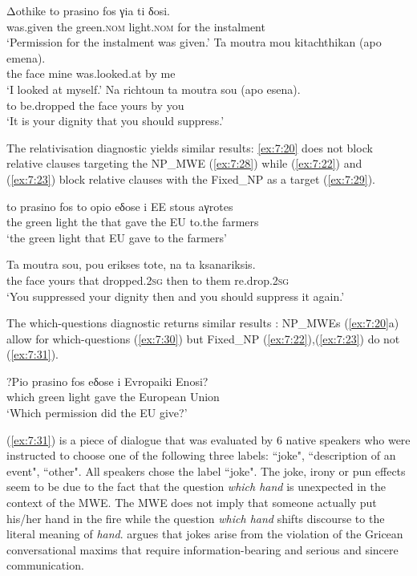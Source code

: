\documentclass[output=paper]{langsci/langscibook}
\begin{document}
\ea%
    \label{ex:7:27}
\ea  \label{ex:7:27a}
\gll        Δothike to prasino fos γia ti δosi. \\
            was.given the green.\textsc{nom} light.\textsc{nom} for the instalment \\
\glt       `Permission for the instalment was given.'
\ex  \label{ex:7:27b}
\gll *Ta moutra mou kitachthikan (apo emena).\\
         the face mine was.looked.at by me\\
\glt        `I looked at myself.'
\ex  \label{ex:7:27c}
\gll *Na richtoun ta moutra sou (apo esena).\\
        to be.dropped the face yours by you\\
\glt `It is your dignity that you should suppress.'
\z
\z

The relativisation diagnostic yields similar results: \ref{ex:7:20} does not block relative clauses targeting the NP\_MWE (\ref{ex:7:28}) while (\ref{ex:7:22}) and (\ref{ex:7:23}) block relative clauses with the Fixed\_NP as a target (\ref{ex:7:29}).

\ea%
    \label{ex:7:28}
\gll   to prasino fos to opio eδose i EE stous aγrotes \\
             the green light the that gave the EU to.the farmers\\
\glt  `the green light that EU gave to the farmers'
\z

 

\ea%
\label{ex:7:29}
\gll *Ta moutra sou, pou erikses tote, na ta ksanariksis.\\
      the face yours that dropped.\textsc{2sg} then to them re.drop.\textsc{2sg} \\
\glt `You suppressed your dignity then and you should suppress it again.'
\z

The which-questions diagnostic returns similar results : NP\_MWEs  (\ref{ex:7:20}a) allow for which-questions (\ref{ex:7:30}) but  Fixed\_NP  (\ref{ex:7:22}),(\ref{ex:7:23}) do not (\ref{ex:7:31}).

\ea%
\label{ex:7:30}
\gll ?Pio prasino fos eδose i Evropaiki Enosi?\\
             which green light gave the European Union\\
\glt        `Which permission did the EU give?'
\z


(\ref{ex:7:31}) is a piece of dialogue that was evaluated by  6 native speakers who were instructed to choose one of the following three labels: ``joke", ``description of an event", ``other". All speakers chose the label ``joke". The joke, irony or pun effects seem to be due to the fact that the question \textit{which hand} is unexpected in the context of the MWE. The MWE does not imply that someone actually put his/her hand in the fire while the question \textit{which hand} shifts discourse to the literal meaning of \textit{hand}. \citet{raskin1985} argues that jokes arise from the violation of the Gricean conversational maxims that require information-bearing and serious and sincere communication. 
\end{document}
